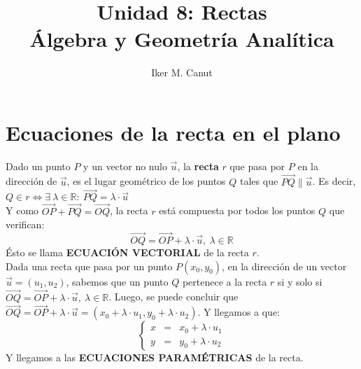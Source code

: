 \documentclass[11pt,a4paper]{article}
\author{Iker M. Canut}
\title{Unidad 8: Rectas\\\'Algebra y Geometr\'ia Anal\'itica}
\begin{document}
\maketitle
\newpage

\section{Ecuaciones de la recta en el plano}
Dado un punto $P$ y un vector no nulo $\overrightarrow{u}$, la \textbf{recta} $r$ que pasa por $P$ en la direcci\'on de $\overrightarrow{u}$, es el lugar geom\'etrico de los puntos $Q$ tales que $\overrightarrow{PQ} \parallel \overrightarrow{u}$. Es decir, $Q \in r \iff \exists\ \lambda \in \mathbb{R} :\ \overrightarrow{PQ} = \lambda \cdot \overrightarrow{u}$\\
\noindent Y como $\overrightarrow{OP} + \overrightarrow{PQ} = \overrightarrow{OQ}$, la recta $r$ est\'a compuesta por todos los puntos $Q$ que verifican: 
\begin{equation}
\overrightarrow{OQ} = \overrightarrow{OP} + \lambda \cdot \overrightarrow{u},\ \lambda \in \mathbb{R}
\end{equation}
\'Esto se llama \textbf{ECUACI\'ON VECTORIAL} de la recta $r$.\\

Dada una recta que pasa por un punto $P(x_0, y_0)$, en la direcci\'on de un vector $\overrightarrow{u}=(u_1,u_2)$, sabemos que un punto $Q$ pertenece a la recta $r$ si y solo si $\overrightarrow{OQ} = \overrightarrow{OP} + \lambda \cdot \overrightarrow{u},\ \lambda \in \mathbb{R}$. Luego, se puede concluir que $\overrightarrow{OQ} = \overrightarrow{OP} + \lambda \cdot \overrightarrow{u} = (x_0 + \lambda \cdot u_1, y_0+\lambda\cdot u_2)$. Y llegamos a que:
\begin{equation}
\left\{\begin{array}{lll}
x & = & x_0 + \lambda \cdot u_1\\
y & = & y_0 + \lambda \cdot u_2
\end{array}\right.
\end{equation}
Y llegamos a las \textbf{ECUACIONES PARAM\'ETRICAS} de la recta.\\
\end{document}
